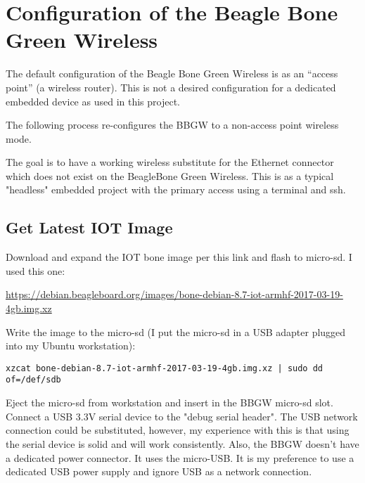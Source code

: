 %
%
%

\chapter{Configuration of the Beagle Bone Green Wireless}

The default configuration of the Beagle Bone Green Wireless is as an ``access 
point'' (a wireless router).  This is not a desired configuration for a 
dedicated embedded device as used in this project.

The following process re-configures the BBGW to a non-access point wireless 
mode.

The goal is to have a working wireless substitute for the Ethernet connector 
which does not exist on the BeagleBone Green Wireless.
This is as a typical "headless" embedded project with the primary access using 
a terminal and ssh.

\section{Get Latest IOT Image}

Download and expand the IOT bone image per this link and flash to micro-sd.  I 
used this one:

\url{https://debian.beagleboard.org/images/bone-debian-8.7-iot-armhf-2017-03-19-4gb.img.xz}

Write the image to the micro-sd (I put the micro-sd in a USB adapter plugged 
into my Ubuntu workstation):

\begin{verbatim}
xzcat bone-debian-8.7-iot-armhf-2017-03-19-4gb.img.xz | sudo dd of=/def/sdb
\end{verbatim}

Eject the micro-sd from workstation and insert in the BBGW micro-sd slot.
Connect a USB 3.3V serial device to the "debug serial header".  The USB network 
connection could be substituted, however, my experience
with this is that using the serial device is solid and will work consistently.
Also, the BBGW doesn't have a dedicated power connector.  It uses the 
micro-USB.
It is my preference to use a dedicated USB power supply and ignore 
USB as a network connection.

